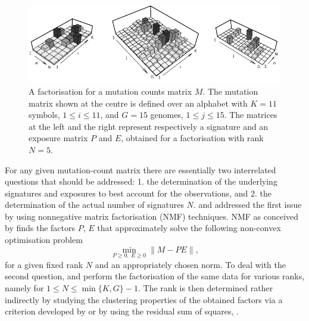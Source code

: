 \documentclass{bioinfo}
\begin{document}
\begin{figure}
  \centering\includegraphics[width = 13.5cm]{figs/f_bw_t}
  \caption{\textrm{%
   A factorisation for a mutation counts matrix $M$. The
   mutation matrix shown at the centre is defined over an alphabet
   with $K = 11$ symbols, $1 \leq i \leq 11$, and $G = 15$ genomes,
   $1\leq j\leq 15$. The matrices at the left and the right
   represent respectively a signature and an exposure matrix $P$ and
   $E$, obtained for a factorisation with rank $N = 5$.
  }
 }
 \label{fig:toyNMF}
\end{figure}

For any given mutation-count matrix there are essentially two
interrelated questions that should be addressed: 1. the determination
of the underlying signatures and exposures to best account for the
observations, and 2. the determination of the actual number of
signatures $N$. \cite{NCell} and \cite{A} addressed the first issue by
using nonnegative matrix factorisation (NMF) techniques. NMF as
conceived by \cite{LS} finds the factors $P$, $E$ that approximately
solve the following non-convex optimisation problem
\begin{equation}
  \label{eqn:NMF}
    \min_{P\geq 0,\ E\geq 0}\|M - PE\|,
\end{equation}
for a given fixed rank $N$ and an appropriately chosen norm.
To deal with the second question, \cite{NCell} and \cite{A}
perform the factorisation of the same data for various ranks, namely
for $1 \leq N \leq \min\{K, G\}-1$. The rank is then determined rather
indirectly by studying the clustering properties of the obtained
factors via a criterion developed by \cite{BTGM} or by using the 
residual sum of squares, \cite{HMSG}.
\end{document}
